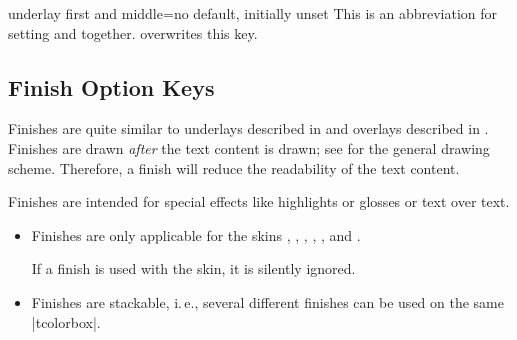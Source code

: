 \begin{docTcbKey}[][doc new=2014-09-19]{underlay first and middle}{=}{no default, initially unset}
  This is an abbreviation for setting
   and
   together.
   overwrites this key.
\end{docTcbKey}


\clearpage
\subsection{Finish Option Keys}\label{subsec:skinfinish}

Finishes are quite similar to underlays described in 
and overlays described in .
Finishes are drawn \emph{after} the text content is drawn; see
 for the general drawing scheme.
Therefore, a finish will reduce the readability of the text content.

Finishes are intended for special effects like highlights or glosses or text over text.

\begin{itemize}
\item Finishes are only applicable for the skins
  ,
  ,
  ,
  ,
  , and
  .
  \begin{marker}
  If a finish is used with the  skin, it is silently ignored.
  \end{marker}
\item Finishes are stackable, i.\,e., several different finishes can be
  used on the same |tcolorbox|.
\end{itemize}

